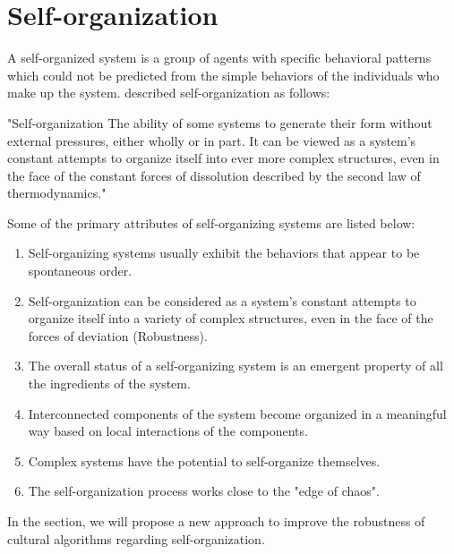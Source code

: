 \section{Self-organization}
A self-organized system is a group of agents with specific behavioral patterns which could not be predicted from the simple behaviors of the  individuals who make up the system. \citet{kennedy2001swarm} described self-organization as follows: 
\begin{displayquote}
	"Self-organization The ability of some systems to generate their form without external pressures, either wholly or in part. It can be viewed as a system's constant attempts to organize itself into ever more complex structures, even in the face of the constant forces of dissolution described by the second law of thermodynamics."
\end{displayquote}
Some of the primary attributes of self-organizing systems are listed below:
\begin{enumerate}
	\item Self-organizing systems usually exhibit the behaviors that appear to be spontaneous order.
	\item Self-organization can be considered as a system's constant attempts to organize itself into a variety of complex structures, even in the face of the forces of deviation (Robustness).
	\item The overall status of a self-organizing system is an emergent property of all the ingredients of the system.
	\item Interconnected components of the system become organized in a meaningful way based on local interactions of the components.
	\item Complex systems have the potential to self-organize themselves.
	\item The self-organization process works close to the "edge of chaos".
\end{enumerate}
In the section, we will propose a new approach to improve the robustness of cultural algorithms regarding self-organization.
